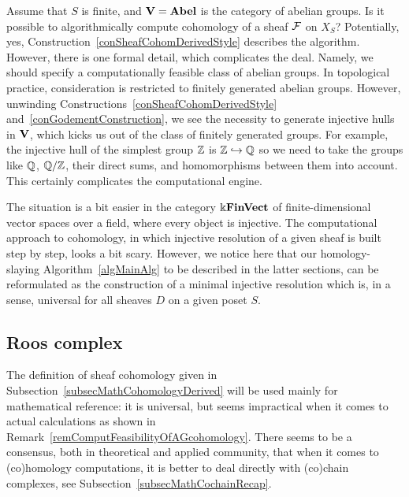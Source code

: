 \begin{rem}\label{remComputFeasibilityOfAGcohomology}
Assume that $S$ is finite, and $\mathbf{V}=\mathbf{Abel}$ is the category of abelian groups. Is it possible to algorithmically compute cohomology of a sheaf $\mathcal{F}$ on $X_S$? Potentially, yes, Construction~\ref{conSheafCohomDerivedStyle} describes the algorithm. However, there is one formal detail, which complicates the deal. Namely, we should specify a computationally feasible class of abelian groups. In topological practice, consideration is restricted to finitely generated abelian groups. However, unwinding Constructions~\ref{conSheafCohomDerivedStyle} and~\ref{conGodementConstruction}, we see the necessity to generate injective hulls in $\mathbf{V}$, which kicks us out of the class of finitely generated groups. For example, the injective hull of the simplest group $\mathbb{Z}$ is $\mathbb{Z}\hookrightarrow \mathbb{Q}$ so we need to take the groups like $\mathbb{Q}$, $\mathbb{Q}/\mathbb{Z}$, their direct sums, and homomorphisms between them into account. This certainly complicates the computational engine.

The situation is a bit easier in the category $\Bbbk\mathbf{FinVect}$ of finite-dimensional vector spaces over a field, where every object is injective. The computational approach to cohomology, in which injective resolution of a given sheaf is built step by step, looks a bit scary. However, we notice here that our homology-slaying Algorithm~\ref{algMainAlg} to be described in the latter sections, can be reformulated as the construction of a minimal injective resolution which is, in a sense, universal for all sheaves $D$ on a given poset $S$. %
\end{rem}

\subsection{Roos complex}\label{subsecMathCohomologySimplicial}

The definition of sheaf cohomology given in Subsection~\ref{subsecMathCohomologyDerived} will be used mainly for mathematical reference: it is universal, but seems impractical when it comes to actual calculations as shown in Remark~\ref{remComputFeasibilityOfAGcohomology}. There seems to be a consensus, both in theoretical and applied community, that when it comes to (co)homology computations, it is better to deal directly with (co)chain complexes, see Subsection~\ref{subsecMathCochainRecap}.

